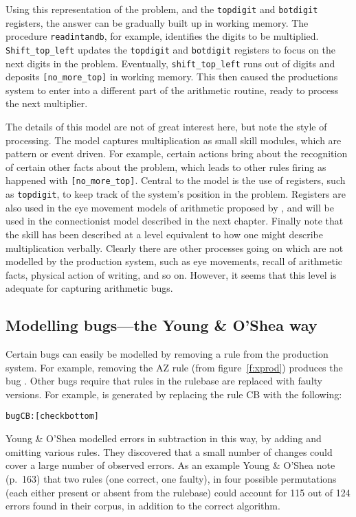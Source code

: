 Using this representation
of the problem, and the \verb|topdigit| and
\verb|botdigit| registers, the answer can be gradually
built up in working memory. The procedure \verb|readintandb|,
for example, identifies the digits to be multiplied.
\verb|Shift_top_left|
updates the \verb|topdigit| and \verb|botdigit| registers to focus on the
next digits in the problem.  Eventually, \verb|shift_top_left| runs out of
digits and deposits \verb|[no_more_top]| in working memory.  This then
caused the productions system to enter into a different part of the
arithmetic routine, ready to process the next multiplier.

The details of this model are not of great interest here, but note the
style of processing.  The model captures multiplication as small skill
modules, which are pattern or event driven.  For example, certain actions
bring about the recognition of certain other facts about the problem, which
leads to other rules firing as happened with \verb|[no_more_top]|.
Central to the model is the use of registers, such as \verb|topdigit|, to
keep track of the system's position in the problem. Registers are also used
in the eye movement models of arithmetic proposed by , and
will be used in the connectionist model described in the next chapter.
Finally note that the skill has been described at a level equivalent to how
one might describe multiplication verbally.  Clearly there are other
processes going on which are not modelled by the production system,
such as eye movements, recall of arithmetic facts, physical action of
writing, and so on.  However, it seems that this level is adequate for
capturing arithmetic bugs.

\subsection{Modelling bugs---the Young \& O'Shea way}\label{s:yo}

Certain bugs can easily be modelled by removing a rule from the production
system. For example, removing the AZ rule (from figure~\ref{f:xprod})
produces the bug
.  Other bugs require that rules in the rulebase are
replaced with faulty versions.  For example,  is
generated by replacing the rule CB with the following:
\begin{alltt}
    bugCB:   [checkbottom]   \anarrow   [no_more]
\end{alltt}

Young \& O'Shea modelled errors in subtraction in this way, by adding and
omitting various rules.  They discovered that a small number of changes
could cover a large number of observed errors.  As an example Young \&
O'Shea note (p.~163) that two rules (one correct, one faulty), in four
possible permutations (each either present or absent from the rulebase)
could account for 115 out of 124 errors found in their corpus, in addition
to the correct algorithm.

